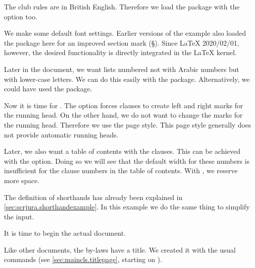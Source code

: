 %
The club rules are in British English. Therefore we load the 
package with the  option too.

%
We make some default font settings. Earlier versions of the example also
loaded the  package here for an improved section mark
(\S). Since \LaTeX{} 2020/02/01, however, the desired functionality is directly
integrated in the \LaTeX{} kernel.

%
Later in the document, we want lists numbered not with Arabic numbers but with
lower-case letters. We can do this easily with the 
package. Alternatively, we could have used the  package.

%
Now it is time for . The
 option forces clauses to
create left and right marks for the running head. On the other hand, we do not
want  to change the marks for the running head.
Therefore we use the  page style. This page style
generally does not provide automatic running heads.

Later, we also want a table of contents with the clauses. This can be achieved
with the  option. Doing so we will see
that the default width for these numbers is insufficient for the clause
numbers in the table of contents. With
, we reserve more space.

The definition of shorthands has already been explained in
\autoref{sec:scrjura.shorthandexample}. In this example we do the same thing
to simplify the input.

%
It is time to begin the actual document.

%
Like other documents, the by-laws have a title. We created it with the usual
\KOMAScript{} commands (see \autoref{sec:maincls.titlepage}, starting on
).


